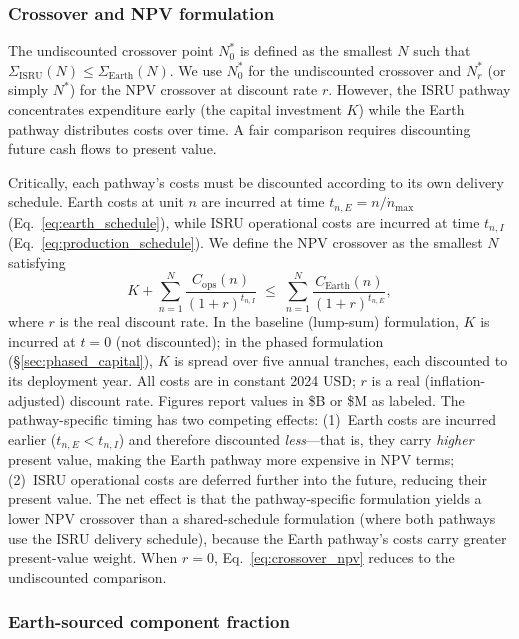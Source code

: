 \documentclass[preprint,12pt]{elsarticle}
\begin{document}
\subsubsection{Crossover and NPV formulation}

The undiscounted crossover point $N^*_0$ is defined as the smallest $N$ such that $\Sigma_{\mathrm{ISRU}}(N) \leq \Sigma_{\mathrm{Earth}}(N)$. We use $N^*_0$ for the undiscounted crossover and $N^*_r$ (or simply $N^*$) for the NPV crossover at discount rate $r$. However, the ISRU pathway concentrates expenditure early (the capital investment $K$) while the Earth pathway distributes costs over time. A fair comparison requires discounting future cash flows to present value.

Critically, each pathway's costs must be discounted according to its own delivery schedule. Earth costs at unit $n$ are incurred at time $t_{n,E} = n/\dot{n}_{\max}$ (Eq.~\ref{eq:earth_schedule}), while ISRU operational costs are incurred at time $t_{n,I}$ (Eq.~\ref{eq:production_schedule}). We define the NPV crossover as the smallest $N$ satisfying
\begin{equation}
  K + \sum_{n=1}^{N} \frac{C_{\mathrm{ops}}(n)}{(1+r)^{t_{n,I}}} \;\leq\; \sum_{n=1}^{N} \frac{C_{\mathrm{Earth}}(n)}{(1+r)^{t_{n,E}}},
  \label{eq:crossover_npv}
\end{equation}
where $r$ is the real discount rate. In the baseline (lump-sum) formulation, $K$ is incurred at $t = 0$ (not discounted); in the phased formulation (\S\ref{sec:phased_capital}), $K$ is spread over five annual tranches, each discounted to its deployment year. All costs are in constant 2024 USD; $r$ is a real (inflation-adjusted) discount rate. Figures report values in \$B or \$M as labeled. The pathway-specific timing has two competing effects: (1)~Earth costs are incurred earlier ($t_{n,E} < t_{n,I}$) and therefore discounted \emph{less}---that is, they carry \emph{higher} present value, making the Earth pathway more expensive in NPV terms; (2)~ISRU operational costs are deferred further into the future, reducing their present value. The net effect is that the pathway-specific formulation yields a lower NPV crossover than a shared-schedule formulation (where both pathways use the ISRU delivery schedule), because the Earth pathway's costs carry greater present-value weight. When $r = 0$, Eq.~\ref{eq:crossover_npv} reduces to the undiscounted comparison.

\subsubsection{Earth-sourced component fraction}
\label{sec:vitamin}
\end{document}
